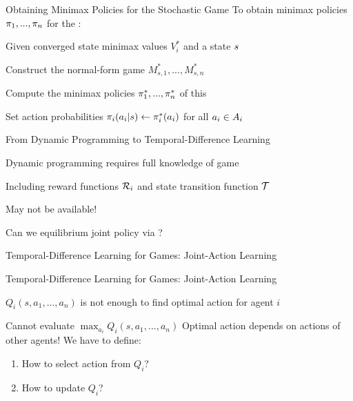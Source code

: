 \begin{frame}{Obtaining Minimax Policies for the Stochastic Game}
    To obtain minimax policies $\pi_1,...,\pi_n$ for the :
    \blist
        \item Given converged state minimax values $V_i^*$ and a state $s$
        \item Construct the normal-form game $M^*_{s,1},...,M^*_{s,n}$
        \item Compute the minimax policies $\pi^*_1,...,\pi^*_n$ of this 
        \item Set action probabilities $\pi_i(a_i | s) \gets \pi^*_i(a_i)$ for all $a_i \in A_i$
    \elist
\end{frame}

\begin{frame}{From Dynamic Programming to Temporal-Difference Learning}
    \begin{problembox}
        Dynamic programming requires full knowledge of game
        \blist
            \item Including reward functions $\mathcal{R}_i$ and state transition function $\mathcal{T}$
            \item May not be available!
        \elist
    \end{problembox}
    Can we  equilibrium joint policy via ?
\end{frame}

\begin{frame}[b]{Temporal-Difference Learning for Games: Joint-Action Learning}
\end{frame}

\begin{frame}{Temporal-Difference Learning for Games: Joint-Action Learning}
    \begin{problembox}
        $Q_i(s,a_1,...,a_n)$ is not enough to find optimal action for agent $i$
        \blist
            \item Cannot evaluate $\max_{a_i} Q_i(s,a_1,...,a_n)$
            \listtab Optimal action depends on actions of other agents!
        \elist
        \pause
        We have to define:
        \begin{enumerate}
            \item How to select action from $Q_i$?
            \item How to update $Q_i$?
        \end{enumerate}
    \end{problembox}
\end{frame}

